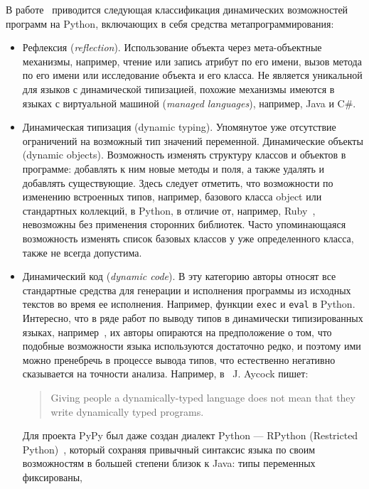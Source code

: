 В работе~\cite[]{Holkner2009} приводится следующая классификация динамических возможностей
программ на Python, включающих в себя средства метапрограммирования: 

\begin{itemize}
  \item{Рефлексия (\emph{reflection}). 
      Использование объекта через мета-объектные механизмы, например,
      чтение или запись атрибут по его имени, вызов метода по его имени или
      исследование объекта и его класса. Не является уникальной для языков с
      динамической типизацией, похожие механизмы имеются в языках с виртуальной
      машиной (\emph{managed languages}), например, Java и C\#.}
  \item{Динамическая типизация (dynamic typing). 
      Упомянутое уже отсутствие
      ограничений на возможный тип значений переменной.  Динамические объекты
      (dynamic objects). Возможность изменять структуру классов и объектов в
      программе: добавлять к ним новые методы и поля, а также удалять и добавлять
      существующие. Здесь следует отметить, что возможности по изменению встроенных
      типов, например, базового класса object или стандартных коллекций, в Python, в
      отличие от, например, Ruby~\cite{Madsen2007}, невозможны без применения сторонних библиотек.
      Часто упоминающаяся возможность изменять список базовых классов у уже
      определенного класса, также не всегда допустима.}
  \item{  
      Динамический код (\emph{dynamic code}).
      В эту категорию авторы относят все стандартные средства для
      генерации и исполнения программы из исходных текстов во время ее
      исполнения.  Например, функции \texttt{exec} и \texttt{eval} в Python.  Интересно, что в ряде
      работ по выводу типов в динамически типизированных языках,
      например~\cite{Salib2004,Aycock2000},  их авторы опираются на предположение о
      том, что подобные возможности языка используются достаточно редко, и поэтому
      ими можно пренебречь в процессе вывода типов, что естественно негативно
      сказывается на точности анализа. Например, в~\cite{Aycock2000} J. Aycock пишет:
      \begin{quote}
        Giving people a dynamically-typed language does not mean that they write
        dynamically typed programs.
      \end{quote}
      Для проекта PyPy был даже создан диалект Python --- RPython (Restricted
      Python)~\cite{Ancona2007}, который сохраняя привычный синтаксис языка по своим
      возможностям в большей степени близок к Java: типы переменных фиксированы,
}
\end{itemize}
